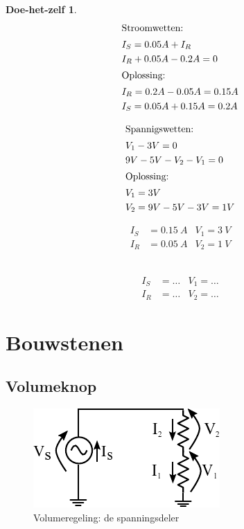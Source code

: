 \documentclass{article}
\newtheorem{DIY}{Doe-het-zelf}
\begin{document}
			\begin{DIY}
			\ifoplossing

			\begin{align*}
			\intertext{Stroomwetten:}
			    &I_S = 0.05A + I_R \\
			    &I_R + 0.05A -0.2A = 0 \\
			 \intertext{Oplossing:}
			 &I_R = 0.2A - 0.05A = 0.15A \\
			 &I_S = 0.05A + 0.15A = 0.2 A
			\end{align*}

			\begin{align*}
			\intertext{Spannigswetten:}
			    &V_1-3V = 0 \\
			    &9V-5V-V_2-V_1 = 0 \\
			 \intertext{Oplossing:}
			 &V_1 = 3V \\
			 &V_2 = 9V-5V-3V = 1V
			\end{align*}

			\begin{align*}
			    I_S &= 0.15~A & V_1 = 3~V\\
			    I_R &= 0.05~A  & V_2 =1~V 
			\end{align*}
			\else
			~\vspace*{20ex}


			\begin{align*}
			    I_S &= \ldots & V_1 = \ldots\\
			    I_R &= \ldots & V_2 =\ldots
			\end{align*}
			\fi



			
			
			\end{DIY}


\section{Bouwstenen}
\subsection{Volumeknop}

			\begin{figure}[h!]
				\centering
				\includegraphics{weerstandsdeler}
				\caption{Volumeregeling: de spanningsdeler}
				\label{fig:volume}
			\end{figure}
\end{document}
